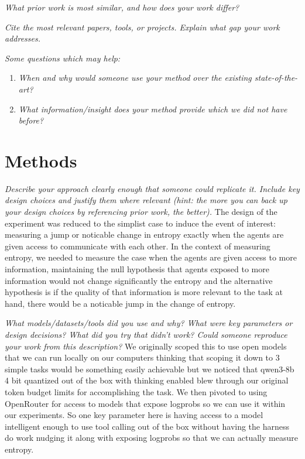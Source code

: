 \documentclass[11pt,letterpaper]{article}
\newcommand{\guide}[1]{\textit{#1}}
\begin{document}
\guide{What prior work is most similar, and how does your work differ?}

\guide{Cite the most relevant papers, tools, or projects. Explain what gap your
work addresses.}

\guide{Some questions which may help:}
\begin{enumerate}[label=(\alph*)]
  \item \guide{When and why would someone use your method over the existing
        state-of-the-art?}
  \item \guide{What information/insight does your method provide which we did
        not have before?}
\end{enumerate}

\section{Methods}

\guide{Describe your approach clearly enough that someone could replicate it.
Include key design choices and justify them where relevant (hint: the more you
can back up your design choices by referencing prior work, the better).}
The design of the experiment was reduced to the simplist case to induce the event of interest: measuring a jump or noticable change in entropy exactly when the agents are given access to communicate with each other. In the context of measuring entropy, we needed to measure the case when the agents are given access to more information, maintaining the null hypothesis that agents exposed to more information would not change significantly the entropy and the alternative hypothesis is if the quality of that information is more relevant to the task at hand, there would be a noticable jump in the change of entropy.

\guide{What models/datasets/tools did you use and why? What were key parameters
or design decisions? What did you try that didn't work? Could someone reproduce
your work from this description?}
We originally scoped this to use open models that we can run locally on our computers thinking that scoping it down to 3 simple tasks would be something easily achievable but we noticed that qwen3-8b 4 bit quantized out of the box with thinking enabled blew through our original token budget limits for accomplishing the task. We then pivoted to using OpenRouter for access to models that expose logprobs so we can use it within our experiments. So one key parameter here is having access to a model intelligent enough to use tool calling out of the box without having the harness do work nudging it along with exposing logprobs so that we can actually measure entropy.  
\end{document}

